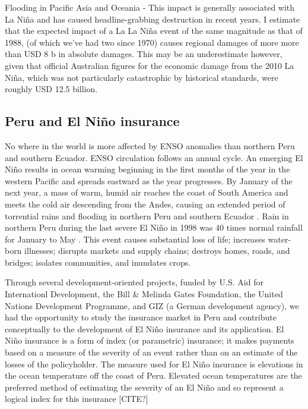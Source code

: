 \documentclass[authoryear]{article}
\begin{document}
Flooding in Pacific Asia and Oceania - This impact is generally associated with La Ni\~na and has caused headline-grabbing destruction in recent years. I estimate that the expected impact of a La La Ni\~na event of the same magnitude as that of 1988, (of which we’ve had two since 1970) causes regional damages of more more than USD 8 b in absolute damages. This may be an underestimate however, given that official Australian figures for the economic damage from the 2010 La Ni\~na, which was not particularly catastrophic by historical standards, were roughly USD 12.5 billion. 

\subsection{Peru and El Ni\~no insurance}
No where in the world is more affected by ENSO anomalies than northern Peru and southern Ecuador. ENSO circulation follows an annual cycle. An emerging El Ni\~no results in ocean warming beginning in the first months of the year in the western Pacific and spreads eastward as the year progresses. By January of the next year, a mass of warm, humid air reaches the coast of South America and meets the cold air descending from the Andes, causing an extended period of torrential rains and flooding in northern Peru and southern Ecuador \citep{lagos2008nino}. Rain in northern Peru during the last severe El Ni\~no in 1998 was 40 times normal rainfall for January to May \citep{skees2009enso}. This event causes substantial loss of life; increases water-born illnesses; disrupts markets and supply chains; destroys homes, roads, and bridges; isolates communities, and inundates crops.

Through several development-oriented projects, funded by U.S. Aid for Internationl Development, the Bill \& Melinda Gates Foundation, the United Nations Development Programme, and GIZ (a German development agency), we had the opportunity to study the insurance market in Peru and contribute conceptually to the development of El Ni\~no insurance and its application. El Ni\~no insurance is a form of index (or parametric) insurance; it makes payments based on a measure of the severity of an event rather than on an estimate of the losses of the policyholder. The measure used for El Ni\~no insurance is elevations in the ocean temperature off the coast of Peru. Elevated ocean temperatures are the preferred method of estimating the severity of an El Ni\~no and so represent a logical index for this insurance [CITE?]
\end{document}
